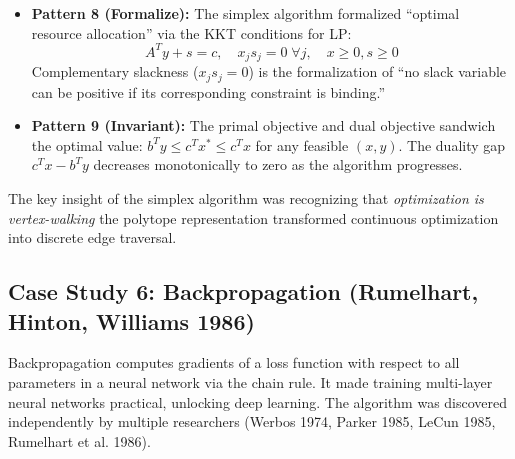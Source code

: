 \begin{itemize}
\item \textbf{Pattern 8 (Formalize):} The simplex algorithm formalized ``optimal resource allocation'' via the KKT conditions for LP:
\[
A^T y + s = c, \quad x_j s_j = 0 \; \forall j, \quad x \ge 0, s \ge 0
\]
Complementary slackness ($x_j s_j = 0$) is the formalization of ``no slack variable can be positive if its corresponding constraint is binding.''

\item \textbf{Pattern 9 (Invariant):} The primal objective and dual objective sandwich the optimal value: $b^T y \le c^T x^* \le c^T x$ for any feasible $(x, y)$. The duality gap $c^T x - b^T y$ decreases monotonically to zero as the algorithm progresses.
\end{itemize}

The key insight of the simplex algorithm was recognizing that \emph{optimization is vertex-walking} the polytope representation transformed continuous optimization into discrete edge traversal.

\subsection{Case Study 6: Backpropagation (Rumelhart, Hinton, Williams 1986)}

Backpropagation computes gradients of a loss function with respect to all parameters in a neural network via the chain rule. It made training multi-layer neural networks practical, unlocking deep learning. The algorithm was discovered independently by multiple researchers (Werbos 1974, Parker 1985, LeCun 1985, Rumelhart et al. 1986).

